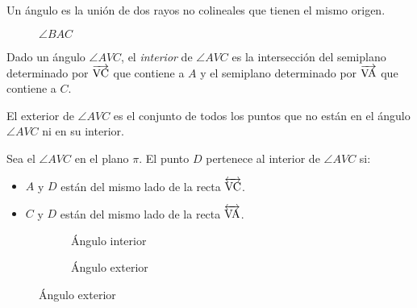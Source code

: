 \begin{definition}
Un ángulo es la unión de dos rayos no colineales que tienen el mismo origen.

\begin{figure}[!h]
    \centering
    
    \label{fig:angle}
    \caption{$\angle{BAC}$}
\end{figure}

\end{definition}

\begin{definition}
Dado un ángulo $\angle{AVC}$, el \textit{interior} de $\angle{AVC}$ es la intersección del semiplano determinado por $\overrightarrow{\rm VC}$ que contiene a $A$ y el semiplano determinado por $\overrightarrow{\rm VA}$ que contiene a $C$.

\end{definition}

\begin{definition}
El exterior de $\angle{AVC}$ es el conjunto de todos los puntos que no están en el ángulo $\angle{AVC}$ ni en su interior.
\end{definition}
    
\begin{definition}
Sea el $\angle{AVC}$ en el plano $\pi$. El punto $D$ pertenece al interior de $\angle{AVC}$ si:

\begin{itemize}
    \item $A$ y $D$ están del mismo lado de la recta $\overleftrightarrow{\rm VC}$.
    \item $C$ y $D$ están del mismo lado de la recta $\overleftrightarrow{\rm VA}$.
\end{itemize}

\begin{figure}[h!]
    \centering
    \begin{subfigure}[b]{.5\textwidth}
        \centering
        
        \caption{Ángulo interior}
        \label{fig:ang-interior}
    \end{subfigure}%
    \begin{subfigure}[b]{.5\textwidth}
        \centering
        
        \caption{Ángulo exterior}
        \label{fig:ang-exterior}
    \end{subfigure}
    \centering
    \label{fig:ang-int-ext}
\end{figure}    

\end{definition}

